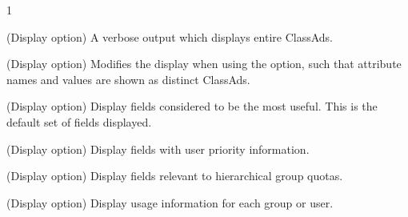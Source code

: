 \begin{ManPage}{\label{man-condor-userprio}}{1}
\begin{Options}
  {(Display option) A verbose output which displays entire ClassAds.  }

  {(Display option) Modifies the display when using the  option,
  such that attribute names and values are shown as distinct ClassAds. }

  {(Display option) Display fields considered to be the most useful.
  This is the default set of fields displayed.   }

  {(Display option) Display fields with user priority information.  }

  {(Display option) Display fields relevant to hierarchical group quotas.  }

  {(Display option) Display usage information for each group or user.}

\end{Options}

\Examples


\end{ManPage}
